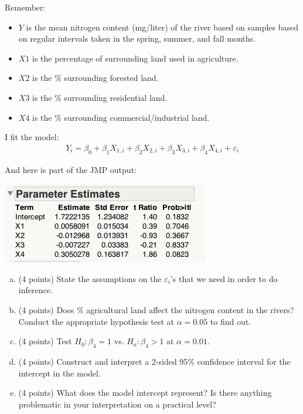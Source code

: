 \documentclass{article}\usepackage{graphicx, color}
\providecommand{\e}{\varepsilon}
\numberwithin{equation}{section}
\begin{document}
\begin{flushleft}
\begin{enumerate}[1. ]
\begin{center}
\end{center}

Remember:
\begin{itemize}
\item $Y$ is the mean nitrogen content (mg/liter) of the river based on samples based on regular intervals taken in the spring, summer, and fall months.
\item $X1$ is the percentage of surrounding land used in agriculture.
\item $X2$ is the \% surrounding forested land.
\item $X3$ is the \% surrounding residential land.
\item $X4$ is the \% surrounding commercial/industrial land.
\end{itemize}

I fit the model:
\begin{align*}
Y_i = \beta_0 + \beta_1 X_{1, i}  + \beta_2 X_{2, i}  + \beta_3 X_{3, i}  + \beta_4 X_{4, i} + \e_i 
\end{align*}

And here is part of the JMP output:

\begin{center}
 \includegraphics{../../fig/riversparams.png}
\end{center}

\begin{enumerate}[a. ]
\item (4 points) State the assumptions on the $\e_i$'s that we need in order to do inference.
\item (4 points) Does \% agricultural land affect the nitrogen content in the rivers? Conduct the appropriate hypothesis test at $\alpha = 0.05$ to find out.
\item (4 points) Test $H_0: \beta_4 = 1$ vs. $H_a: \beta_4 > 1$ at $\alpha = 0.01$.
\item (4 points) Construct and interpret a 2-sided 95\% confidence interval for the intercept in the model.
\item (4 points) What does the model intercept represent? Is there anything problematic in your interpretation on a practical level?
\end{enumerate}




\end{enumerate}
\end{flushleft}
\end{document}
